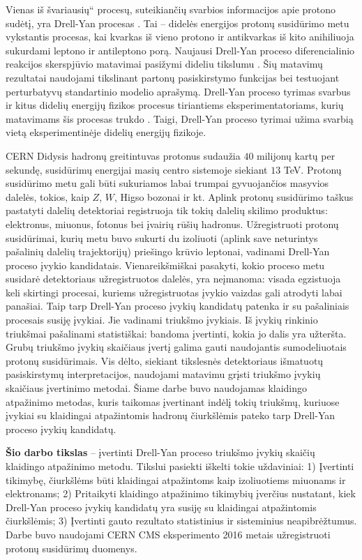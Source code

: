 \documentclass[a4paper, 12pt, oneside]{article}
\newcommand{\ltq}[1]{{\quotedblbase{}#1\textquotedblleft{}}}
\newlength\q
\begin{document}
Vienas iš \ltq{švariausių} procesų, suteikiančių svarbios informacijos apie protono sudėtį, yra
Drell-Yan procesas \cite{DYoriginal}.
Tai -- didelės energijos protonų susidūrimo metu vykstantis procesas, kai kvarkas iš vieno protono ir antikvarkas
iš kito anihiliuoja sukurdami leptono ir antileptono porą.
Naujausi Drell-Yan proceso diferencialinio reakcijos skerspjūvio matavimai pasižymi dideliu tikslumu
\cite{DY_CMS2013, DY_ATLAS2013, DY_ATLAS2014, DY_CMS2015, DY_ATLAS2016, DY_ATLAS2017, DY_CMS2019}.
Šių matavimų rezultatai naudojami tikslinant partonų pasiskirstymo funkcijas bei testuojant perturbatyvų standartinio
modelio aprašymą.
Drell-Yan proceso tyrimas svarbus ir kitus didelių energijų fizikos procesus tiriantiems eksperimentatoriams,
kurių matavimams šis procesas trukdo \cite{Higgs2018, Zprime, SUSYtau}.
Taigi, Drell-Yan proceso tyrimai užima svarbią vietą eksperimentinėje didelių energijų fizikoje.

CERN Didysis hadronų greitintuvas protonus sudaužia $40$ milijonų kartų per sekundę, susidūrimų energijai masių
centro sistemoje siekiant $13$ TeV.
Protonų susidūrimo metu gali būti sukuriamos labai trumpai gyvuojančios masyvios dalelės, tokios, kaip
$Z$, $W$, Higso bozonai ir kt.
Aplink protonų susidūrimo taškus pastatyti dalelių detektoriai registruoja tik tokių dalelių skilimo produktus:
elektronus, miuonus, fotonus bei įvairių rūšių hadronus.
Užregistruoti protonų susidūrimai, kurių metu buvo sukurti du izoliuoti (aplink save neturintys pašalinių dalelių
trajektorijų) priešingo krūvio leptonai, vadinami Drell-Yan proceso įvykio kandidatais.
Vienareikšmiškai pasakyti, kokio proceso metu susidarė detektoriaus užregistruotos dalelės, yra neįmanoma:
visada egzistuoja keli skirtingi procesai, kuriems užregistruotas įvykio vaizdas gali atrodyti labai panašiai.
Taip tarp Drell-Yan proceso įvykių kandidatų patenka ir su pašaliniais procesais susiję įvykiai.
Jie vadinami triukšmo įvykiais.
Iš įvykių rinkinio triukšmai pašalinami statistiškai: bandoma įvertinti, kokia jo dalis yra užteršta.
Grubų triukšmo įvykių skaičiaus įvertį galima gauti naudojantis sumodeliuotais protonų susidūrimais.
Vis dėlto, siekiant tikslesnės detektoriaus išmatuotų pasiskirstymų interpretacijos, naudojami matavimu grįsti
triukšmo įvykių skaičiaus įvertinimo metodai.
Šiame darbe buvo naudojamas klaidingo atpažinimo metodas, kuris taikomas įvertinant indėlį tokių triukšmų, kuriuose
įvykiai su klaidingai atpažintomis hadronų čiurkšlėmis pateko tarp Drell-Yan proceso įvykių kandidatų.

\textbf{Šio darbo tikslas} -- įvertinti Drell-Yan proceso triukšmo įvykių skaičių klaidingo atpažinimo metodu.
Tikslui pasiekti iškelti tokie uždaviniai:
1) Įvertinti tikimybę, čiurkšlėms būti klaidingai atpažintoms kaip izoliuotiems miuonams ir elektronams;
2) Pritaikyti klaidingo atpažinimo tikimybių įverčius nustatant, kiek Drell-Yan proceso įvykių kandidatų yra susiję su
klaidingai atpažintomis čiurkšlėmis;
3) Įvertinti gauto rezultato statistinius ir sisteminius neapibrėžtumus.
Darbe buvo naudojami CERN CMS eksperimento 2016 metais užregistruoti protonų susidūrimų duomenys.
\end{document}
